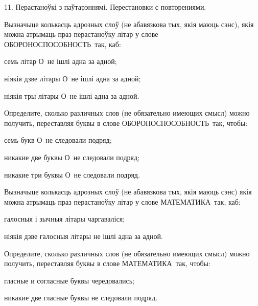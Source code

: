 



\biLangHeader
{11. Перастаноўкі з паўтарэннямі.}
{Перестановки с повторениями.}

\begin{problemList}

\problemItemSimple
{Вызначыце колькасць адрозных слоў (не абавязкова тых, якія маюць сэнс), якія можна атрымаць
праз перастаноўку літар у слове \guillemotleft ОБОРОНОСПОСОБНОСТЬ\guillemotright\ так, каб:
\begin{belarusianEnumerate}
  \item семь літар \guillemotleft О\guillemotright\ не ішлі адна за адной;
  \item ніякія дзве літары \guillemotleft О\guillemotright\ не ішлі адна за адной;
  \item ніякія тры літары \guillemotleft О\guillemotright\ не ішлі адна за адной.
\end{belarusianEnumerate}
}
{Определите, сколько различных слов (не обязательно имеющих смысл) можно
получить, переставляя буквы в слове \guillemotleft ОБОРОНОСПОСОБНОСТЬ\guillemotright\
так, чтобы:
\begin{russianEnumerate}
  \item семь букв \guillemotleft О\guillemotright\ не следовали подряд;
  \item никакие две буквы \guillemotleft О\guillemotright\ не следовали подряд;
  \item никакие три буквы \guillemotleft О\guillemotright\ не следовали подряд.
\end{russianEnumerate}}

\bigskip

\problemItemSimple
{Вызначыце колькасць адрозных слоў (не абавязкова тых, якія маюць сэнс) якія можна атрымаць
праз перастаноўку літар у слове \guillemotleft МАТЕМАТИКА\guillemotright\ так, каб:
\begin{belarusianEnumerate}
  \item галосныя і зычныя літары чаргаваліся;
  \item ніякія дзве галосныя літары не ішлі адна за адной.
\end{belarusianEnumerate}
}
{Определите, сколько различных слов (не обязательно имеющих смысл) можно
получить, переставляя буквы в слове \guillemotleft МАТЕМАТИКА\guillemotright\
так, чтобы:
\begin{russianEnumerate}
  \item гласные и согласные буквы чередовались;
  \item никакие две гласные буквы не следовали подряд.
\end{russianEnumerate}}


\end{problemList}
